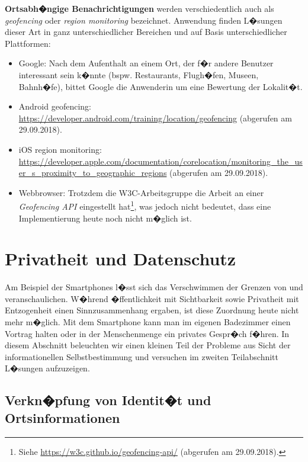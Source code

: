 \begin{example}
\textbf{Ortsabh�ngige Benachrichtigungen} werden verschiedentlich auch als \textit{geofencing} oder \textit{region monitoring} bezeichnet. Anwendung finden L�sungen dieser Art in ganz unterschiedlicher Bereichen und auf Basis unterschiedlicher Plattformen:
\begin{itemize}
\item Google: Nach dem Aufenthalt an einem Ort, der f�r andere Benutzer interessant sein k�nnte (bspw. Restaurants, Flugh�fen, Museen, Bahnh�fe), bittet Google die Anwenderin um eine Bewertung der Lokalit�t.
\item Android geofencing: \url{https://developer.android.com/training/location/geofencing} (abgerufen am 29.09.2018). 
\item iOS region monitoring: \url{https://developer.apple.com/documentation/corelocation/monitoring_the_user_s_proximity_to_geographic_regions} (abgerufen am 29.09.2018).
\item Webbrowser: Trotzdem die W3C-Arbeitsgruppe die Arbeit an einer \textit{Geofencing API} eingestellt hat\footnote{Siehe \url{https://w3c.github.io/geofencing-api/} (abgerufen am 29.09.2018).}, was jedoch nicht bedeutet, dass eine Implementierung heute noch nicht m�glich ist.
\end{itemize} 
\end{example}
 


\section{Privatheit und Datenschutz}

Am Beispiel der Smartphones l�sst sich das Verschwimmen der Grenzen von  und  veranschaulichen. W�hrend �ffentlichkeit mit Sichtbarkeit sowie Privatheit mit Entzogenheit einen Sinnzusammenhang ergaben, ist diese Zuordnung heute nicht mehr m�glich. Mit dem Smartphone kann man im eigenen Badezimmer einen Vortrag halten oder in der Menschenmenge ein privates Gespr�ch f�hren. In diesem Abschnitt beleuchten wir einen kleinen Teil der Probleme aus Sicht der informationellen Selbstbestimmung und versuchen im zweiten Teilabschnitt L�sungen aufzuzeigen.

\subsection{Verkn�pfung von Identit�t und Ortsinformationen}

